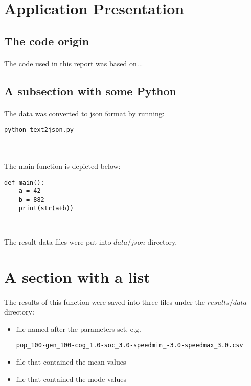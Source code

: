 \section{Application Presentation}

\subsection{The code origin}
\paragraph{}
The code used in this report was based on...

\subsection{A subsection with some Python}
\paragraph{}
The data was converted to json format by running:
\begin{lstlisting}
python text2json.py
\end{lstlisting}\

\paragraph{}
The main function is depicted below:

\begin{lstlisting}
def main():
    a = 42
    b = 882
    print(str(a+b))
\end{lstlisting}\

The result data files were put into $data/json$ directory. 

\section{A section with a list}
\paragraph{}
The results of this function were saved into three files under the $results/data$ directory:
\begin{itemize}
    \item file named after the parameters set, e.g. \begin{verbatim}pop_100-gen_100-cog_1.0-soc_3.0-speedmin_-3.0-speedmax_3.0.csv\end{verbatim}
    \item file that contained the mean values
    \item file that contained the mode values
\end{itemize}

